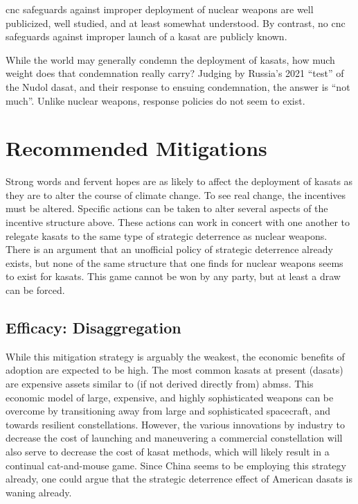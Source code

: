 \ac{cnc} safeguards against improper deployment of nuclear weapons are
well publicized, well studied, and at least somewhat
understood.\cite{nuke-matters-handbook} By contrast, no \ac{cnc}
safeguards against improper launch of a \ac{kasat} are publicly known.

While the world may generally condemn the deployment of \acp{kasat},
how much weight does that condemnation really carry?  Judging by
Russia's 2021 ``test'' of the Nudol \ac{dasat}, and their response to
ensuing condemnation, the answer is ``not much''.  Unlike nuclear
weapons, response policies do not seem to exist.


\section*{Recommended Mitigations}

Strong words and fervent hopes are as likely to affect the deployment
of \acp{kasat} as they are to alter the course of climate change.  To
see real change, the incentives must be altered.  Specific actions can
be taken to alter several aspects of the incentive structure above.
These actions can work in concert with one another to relegate
\acp{kasat} to the same type of strategic deterrence as nuclear
weapons.  There is an argument that an unofficial policy of strategic
deterrence already exists, but none of the same structure that one
finds for nuclear weapons seems to exist for \acp{kasat}.  This game
cannot be won by any party, but at least a draw can be forced.


\subsection*{Efficacy: Disaggregation}
While this mitigation strategy is arguably the weakest, the economic
benefits of adoption are expected to be high.  The most common
\acp{kasat} at present (\acp{dasat}) are expensive assets similar to
(if not derived directly from) \acp{abms}.\cite[pxiii]{brian} This
economic model of large, expensive, and highly sophisticated weapons
can be overcome by transitioning away from large and sophisticated
spacecraft, and towards resilient constellations.  However, the
various innovations by industry to decrease the cost of launching and
maneuvering a commercial constellation will also serve to decrease the
cost of \ac{kasat} methods, which will likely result in a continual
cat-and-mouse game.  Since China seems to be employing this strategy
already, one could argue that the strategic deterrence effect of
American \acp{dasat} is waning already.

